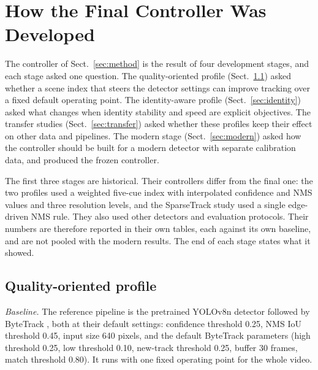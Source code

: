 \documentclass[pdflatex,sn-mathphys-num,iicol]{sn-jnl}
\begin{document}
\section{How the Final Controller Was Developed}\label{sec:development}

The controller of Sect.~\ref{sec:method} is the result of four development
stages, and each stage asked one question. The quality-oriented profile
(Sect.~\ref{sec:quality}) asked whether a scene index that steers the detector
settings can improve tracking over a fixed default operating point. The
identity-aware profile (Sect.~\ref{sec:identity}) asked what changes when
identity stability and speed are explicit objectives. The transfer studies
(Sect.~\ref{sec:transfer}) asked whether these profiles keep their effect on
other data and pipelines. The modern stage (Sect.~\ref{sec:modern}) asked how
the controller should be built for a modern detector with separate
calibration data, and produced the frozen controller.

The first three stages are historical. Their controllers differ from the
final one: the two profiles used a weighted five-cue index with interpolated
confidence and NMS values and three resolution levels, and the SparseTrack
study used a single edge-driven NMS rule. They also used other detectors and
evaluation protocols. Their numbers are therefore reported in their own
tables, each against its own baseline, and are not pooled with the modern
results. The end of each stage states what it showed.

\subsection{Quality-oriented profile}\label{sec:quality}

\emph{Baseline.} The reference pipeline is the pretrained YOLOv8n detector
\cite{jocher2023yolov8} followed by ByteTrack \cite{zhang2022bytetrack}, both at
their default settings: confidence threshold 0.25, NMS IoU threshold 0.45,
input size 640 pixels, and the default ByteTrack parameters (high threshold
0.25, low threshold 0.10, new-track threshold 0.25, buffer 30 frames, match
threshold 0.80). It runs with one fixed operating point for the whole video.
\end{document}
